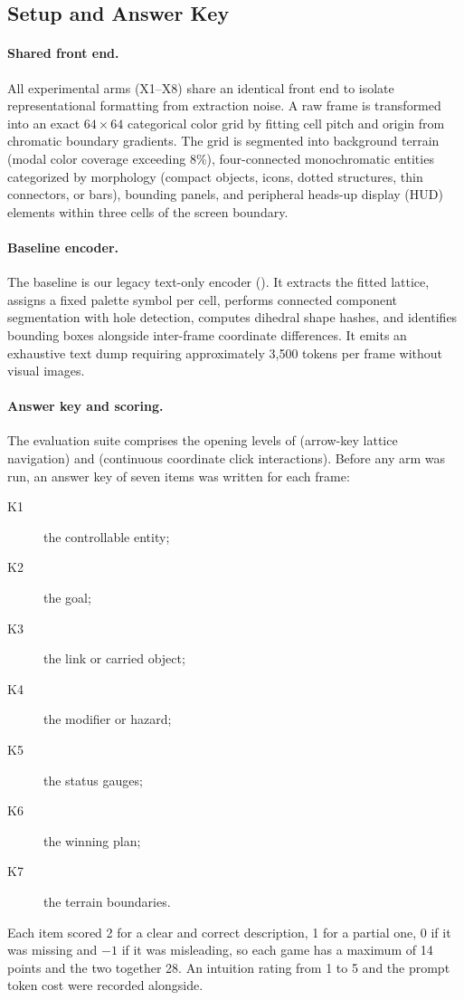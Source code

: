 \subsection{Setup and Answer Key}
\label{sec:lab}

\paragraph{Shared front end.}
All experimental arms (X1--X8) share an identical front end to isolate representational formatting from extraction noise. A raw frame is transformed into an exact $64{\times}64$ categorical color grid by fitting cell pitch and origin from chromatic boundary gradients. The grid is segmented into background terrain (modal color coverage exceeding 8\%), four-connected monochromatic entities categorized by morphology (compact objects, icons, dotted structures, thin connectors, or bars), bounding panels, and peripheral heads-up display (HUD) elements within three cells of the screen boundary.

\paragraph{Baseline encoder.}
The baseline is our legacy text-only encoder (). It extracts the fitted lattice, assigns a fixed palette symbol per cell, performs connected component segmentation with hole detection, computes dihedral shape hashes, and identifies bounding boxes alongside inter-frame coordinate differences. It emits an exhaustive text dump requiring approximately 3,500 tokens per frame without visual images.

\paragraph{Answer key and scoring.}
The evaluation suite comprises the opening levels of  (arrow-key lattice navigation) and  (continuous coordinate click interactions). Before any arm was run, an answer key of seven items was written for each frame:
\begin{description}
    \item[K1] the controllable entity;
    \item[K2] the goal;
    \item[K3] the link or carried object;
    \item[K4] the modifier or hazard;
    \item[K5] the status gauges;
    \item[K6] the winning plan;
    \item[K7] the terrain boundaries.
\end{description}
Each item scored 2 for a clear and correct description, 1 for a partial one, 0 if it was missing and $-1$ if it was misleading, so each game has a maximum of 14 points and the two together 28. An intuition rating from 1 to 5 and the prompt token cost were recorded alongside.

